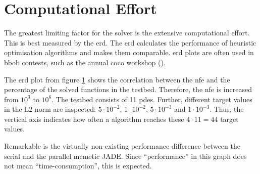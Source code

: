 \documentclass[./\jobname.tex]{subfiles}
\begin{document}
\section{Computational Effort}
\label{chap:computational_effort}

The greatest limiting factor for the solver is the extensive computational effort. This is best measured by the \gls{erd}. The \gls{erd} calculates the performance of heuristic optimisation algorithms and makes them comparable. \gls{erd} plots are often used in \gls{bbob} contests, such as the annual \gls{coco} workshop (\cite{nikolaus_hansen_2019_2594848}).

The \gls{erd} plot from figure \ref{fig:ert_plot} shows the correlation between the \gls{nfe} and the percentage of the solved functions in the testbed. Therefore, the \gls{nfe} is increased from $10^3$ to $10^6$. The testbed consists of 11 \gls{pde}s. Further, different target values in the L2 norm are inspected: $5\cdot 10^{-2}$, $1\cdot 10^{-2}$, $5\cdot 10^{-3}$ and $1\cdot 10^{-3}$. Thus, the vertical axis indicates how often a algorithm reaches these $4 \cdot 11 = 44$ target values. 

\begin{figure}[H]
	\centering
	\noindent{}
	\label{fig:ert_plot}
\end{figure}

Remarkable is the virtually non-existing performance difference between the serial and the parallel memetic JADE. Since ``performance'' in this graph does not mean ``time-consumption'', this is expected.
\end{document}
